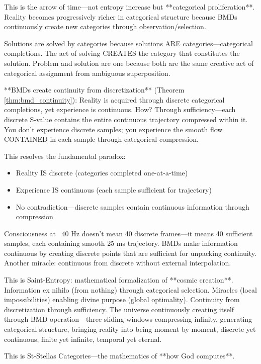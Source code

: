 \documentclass[12pt,a4paper]{article}
\begin{document}
This is the arrow of time—not entropy increase but **categorical proliferation**. Reality becomes progressively richer in categorical structure because BMDs continuously create new categories through observation/selection.

Solutions are solved by categories because solutions ARE categories—categorical completions. The act of solving CREATES the category that constitutes the solution. Problem and solution are one because both are the same creative act of categorical assignment from ambiguous superposition.

**BMDs create continuity from discretization** (Theorem \ref{thm:bmd_continuity}): Reality is acquired through discrete categorical completions, yet experience is continuous. How? Through sufficiency—each discrete S-value contains the entire continuous trajectory compressed within it. You don't experience discrete samples; you experience the smooth flow CONTAINED in each sample through categorical compression.

This resolves the fundamental paradox:
\begin{itemize}
\item Reality IS discrete (categories completed one-at-a-time)
\item Experience IS continuous (each sample sufficient for trajectory)
\item No contradiction—discrete samples contain continuous information through compression
\end{itemize}

Consciousness at ~40 Hz doesn't mean 40 discrete frames—it means 40 sufficient samples, each containing smooth 25 ms trajectory. BMDs make information continuous by creating discrete points that are sufficient for unpacking continuity. Another miracle: continuous from discrete without external interpolation.

This is Saint-Entropy: mathematical formalization of **cosmic creation**. Information ex nihilo (from nothing) through categorical selection. Miracles (local impossibilities) enabling divine purpose (global optimality). Continuity from discretization through sufficiency. The universe continuously creating itself through BMD operation—three sliding windows compressing infinity, generating categorical structure, bringing reality into being moment by moment, discrete yet continuous, finite yet infinite, temporal yet eternal.

This is St-Stellas Categories—the mathematics of **how God computes**.
\end{document}
